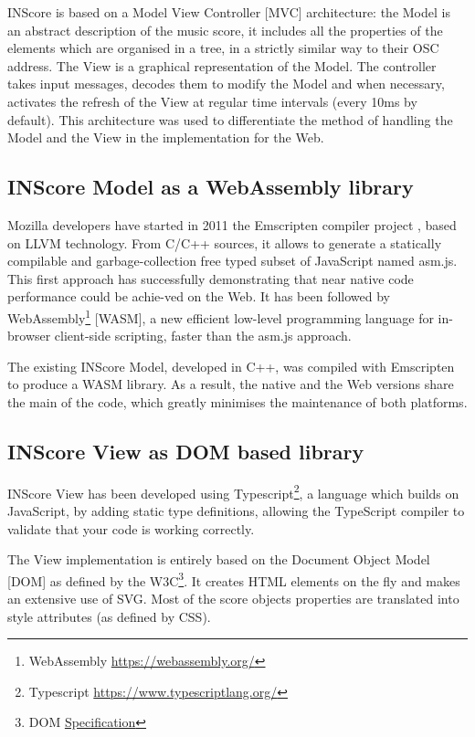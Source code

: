 \documentclass{article}
\begin{document}
INScore is based on a Model View Controller [MVC] architecture: the Model is an abstract description of the music score, it includes all the properties of the elements which are organised in a tree, in a strictly similar way to their OSC address. The View is a graphical representation of the Model.
The controller takes input messages, decodes them to modify the Model and when necessary, activates the refresh of the View at regular time intervals (every 10ms by default).
This architecture was used to differentiate the method of handling the Model and the View in the implementation for the Web.

\subsection{INScore Model as a WebAssembly library}

Mozilla developers have started in 2011 the Emscripten compiler project \cite{10.1145/2048147.2048224}, based on LLVM technology. From C/C++ sources, it allows to generate a statically compilable and garbage-collection free typed subset of JavaScript named asm.js. This first approach has successfully demonstrating that near native code performance could be achie-ved on the Web. It has been followed by WebAssembly\footnote{WebAssembly \url{https://webassembly.org/}} [WASM], a new efficient low-level programming language for in-browser client-side scripting, faster than the asm.js approach.

The existing INScore Model, developed in C++, was compiled with Emscripten to produce a WASM library. 
As a result, the native and the Web versions share the main of the code, which greatly minimises the maintenance of both platforms.

\subsection{INScore View as DOM based library}

INScore View has been developed using Typescript\footnote{Typescript \url{https://www.typescriptlang.org/}}, a language which builds on JavaScript, by adding static type definitions, allowing the TypeScript compiler to validate that your code is working correctly.

The View implementation is entirely based on the Document Object Model [DOM] as defined by the W3C\footnote{DOM \href{https://www.w3.org/TR/2000/WD-DOM-Level-1-20000929/DOM.pdf}{Specification}}. It creates HTML elements on the fly and makes an extensive use of SVG. Most of the score objects properties are translated into style attributes (as defined by CSS).
\end{document}
